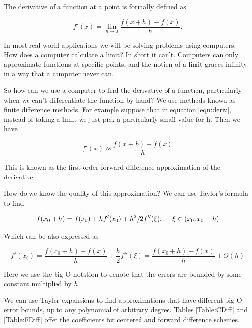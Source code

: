 \label{Ch:Numerical Derivatives}


The derivative of a function at a point is formally defined as

\begin{equation}
\label{eqn:deriv}
f'(x) = \lim_{h\rightarrow 0} \frac{f(x + h)-f(x)}{h}.
\end{equation}

In most real world applications we will be solving problems using computers. How does a computer calculate a limit? In short it can't. Computers can only approximate functions at specific points, and the notion of a limit graces infinity in a way that a computer never can.

So how can we use a computer to find the derivative of a function, particularly when we can't differentiate the function by hand? We use methods known as finite difference methods. For example suppose that in equation \ref{eqn:deriv}, instead of taking a limit we just pick a particularly small value for h. Then we have

\begin{equation*}
f'(x) \approx \frac{f(x + h)-f(x)}{h}
\end{equation*}

This is known as the first order forward difference approximation of the derivative.

How do we know the quality of this approximation? We can use Taylor's formula to find

\begin{equation*}
f(x_0 + h) = f(x_0) + hf'(x_0) + h^2/2 f''(\xi),\hspace{5mm} \xi \in (x_0,x_0 + h)
\end{equation*}

Which can be also expressed as

\begin{equation*}
f'(x_0) = \frac{f(x_0 + h) - f(x)}{h} + \frac{h}{2}f''(\xi) = \frac{f(x_0 + h) - f(x)}{h} + O(h)
\end{equation*}

Here we use the big-O notation to denote that the errors are bounded by some constant multiplied by $h$.

We can use Taylor expansions to find approximations that have different big-O error bounds, up to any polynomial of arbitrary degree. Tables \ref{Table:CDiff} and \ref{Table:FDiff} offer the coefficients for centered and forward difference schemes.


